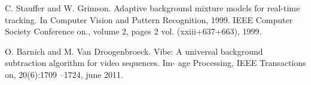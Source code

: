\begin{thebibliography}{9}

C. Stauffer and W. Grimson. Adaptive background mixture
models for real-time tracking. In Computer Vision and Pattern Recognition, 1999. IEEE Computer Society Conference on., volume 2, pages 2 vol. (xxiii+637+663), 1999.

O. Barnich and M. Van Droogenbroeck. Vibe: A universal
background subtraction algorithm for video sequences. Im-
age Processing, IEEE Transactions on, 20(6):1709 –1724,
june 2011.
 

\end{thebibliography}